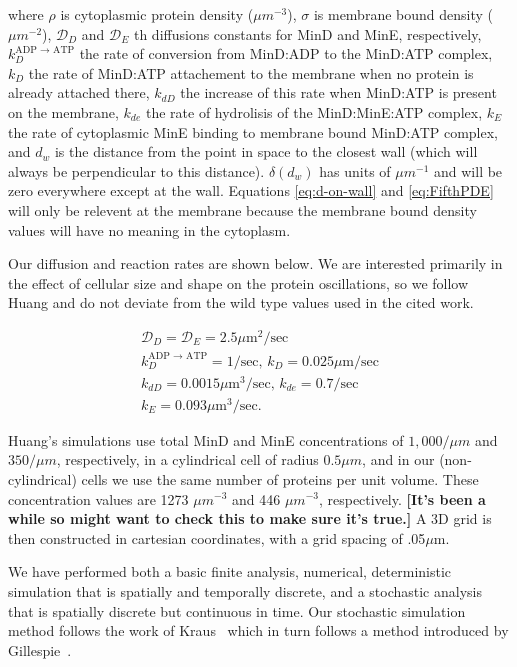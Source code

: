 \documentclass[letterpaper,twocolumn,amsmath,amssymb,pre]{revtex4-1}
\newcommand{\red}[1]{{\bf \color{red} #1}}
\newcommand{\fixme}[1]{\red{[#1]}}
\newcommand\micron{\ensuremath{\mu\text{m}}}
\begin{document}
where $\rho$ is cytoplasmic protein density ($\mu m^{-3}$), $\sigma$
is membrane bound density ($\mu m^{-2}$), $\mathcal{D}_D$ and
$\mathcal{D}_{E}$ th diffusions constants for MinD and MinE,
respectively, $k_D^{\textrm{ADP $\rightarrow$ ATP}}$ the rate of
conversion from MinD:ADP to the MinD:ATP complex, $k_D$ the rate of
MinD:ATP attachement to the membrane when no protein is already
attached there, $k_{dD}$ the increase of this rate when MinD:ATP is
present on the membrane, $k_{de}$ the rate of hydrolisis of the
MinD:MinE:ATP complex, $k_E$ the rate of cytoplasmic MinE binding to
membrane bound MinD:ATP complex, and $d_w$ is the distance from the
point in space to the closest wall (which will always be
perpendicular to this distance).  $\delta(d_w)$ has units of
$\mu m^{-1}$ and will be zero everywhere except at the wall.
Equations \ref{eq:d-on-wall} and \ref{eq:FifthPDE} will only be
relevent at the membrane because the membrane bound density values
will have no meaning in the cytoplasm.

Our diffusion and reaction rates are shown below.  We are interested
primarily in the effect of cellular size and shape on the protein
oscillations, so we follow Huang\cite{huang2003dynamic} and do not
deviate from the wild type values used in the cited work.

\begin{gather*}
  \mathcal{D}_D = \mathcal{D}_{E} = 2.5\micron^2/\text{sec}\\
  k_D^{\textrm{ADP $\rightarrow$ ATP}} = 1/\textrm{sec,  }
  k_D = 0.025 \micron /\textrm{sec}\\
  k_{dD} = 0.0015 \micron^3/ \textrm{sec,  }
  k_{de} = 0.7/\textrm{sec}\\
  k_E = 0.093 \micron^3 /\textrm{sec}.
\end{gather*}

Huang's simulations use total MinD and MinE concentrations of
$1,000/\mu m$ and $350/\mu m$, respectively, in a cylindrical cell of
radius $0.5\mu m$, and in our (non-cylindrical) cells we use the same
number of proteins per unit volume.  These concentration values are
1273 $\mu m^{-3}$ and 446 $\mu m^{-3}$, respectively. \fixme{It's been
  a while so might want to check this to make sure it's true.}  A 3D
grid is then constructed in cartesian coordinates, with a grid spacing
of .05\micron.

We have performed both a basic finite analysis, numerical,
deterministic simulation that is spatially and temporally discrete,
and a stochastic analysis that is spatially discrete but continuous in
time.  Our stochastic simulation method follows the work of
Kraus~\cite{kraus1996crosstalk} which in turn follows a method
introduced by Gillespie~\cite{gillespie1977exact}.
\end{document}

